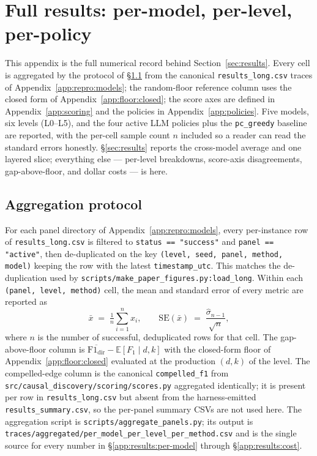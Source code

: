 \section{Full results: per-model, per-level, per-policy}
\label{app:results}

This appendix is the full numerical record behind Section~\ref{sec:results}. Every cell is aggregated by the protocol of \S\ref{app:results:protocol} from the canonical \texttt{results\_long.csv} traces of Appendix~\ref{app:repro:models}; the random-floor reference column uses the closed form of Appendix~\ref{app:floor:closed}; the score axes are defined in Appendix~\ref{app:scoring} and the policies in Appendix~\ref{app:policies}. Five models, six levels (L0--L5), and the four active LLM policies plus the \texttt{pc\_greedy} baseline are reported, with the per-cell sample count $n$ included so a reader can read the standard errors honestly. \S\ref{sec:results} reports the cross-model average and one layered slice; everything else --- per-level breakdowns, score-axis disagreements, gap-above-floor, and dollar costs --- is here.

\subsection{Aggregation protocol}
\label{app:results:protocol}

For each panel directory of Appendix~\ref{app:repro:models}, every per-instance row of \texttt{results\_long.csv} is filtered to \texttt{status == "success"} and \texttt{panel == "active"}, then de-duplicated on the key \texttt{(level, seed, panel, method, model)} keeping the row with the latest \texttt{timestamp\_utc}. This matches the de-duplication used by \texttt{scripts/make\_paper\_figures.py:load\_long}. Within each \texttt{(panel, level, method)} cell, the mean and standard error of every metric are reported as
\begin{equation}
\bar x \;=\; \tfrac{1}{n} \textstyle\sum_{i=1}^{n} x_i,
\qquad
\mathrm{SE}(\bar x) \;=\; \frac{\hat\sigma_{n-1}}{\sqrt{n}},
\end{equation}
where $n$ is the number of successful, deduplicated rows for that cell. The gap-above-floor column is $\overline{\mathrm{F1_{dir}}} - \mathbb{E}[F_1 \mid d, k]$ with the closed-form floor of Appendix~\ref{app:floor:closed} evaluated at the production $(d, k)$ of the level. The compelled-edge column is the canonical \texttt{compelled\_f1} from \texttt{src/causal\_discovery/scoring/scores.py} aggregated identically; it is present per row in \texttt{results\_long.csv} but absent from the harness-emitted \texttt{results\_summary.csv}, so the per-panel summary CSVs are not used here. The aggregation script is \texttt{scripts/aggregate\_panels.py}; its output is \texttt{traces/aggregated/per\_model\_per\_level\_per\_method.csv} and is the single source for every number in \S\ref{app:results:per-model} through \S\ref{app:results:cost}.

